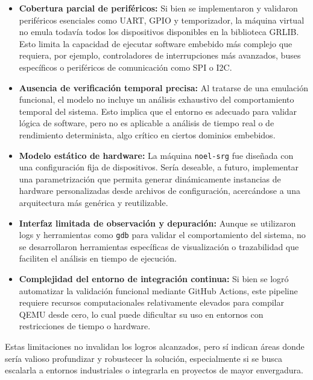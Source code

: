 \begin{itemize}
    \item \textbf{Cobertura parcial de periféricos:} Si bien se implementaron y validaron periféricos esenciales como UART, GPIO y temporizador, la máquina virtual no emula todavía todos los dispositivos disponibles en la biblioteca GRLIB. Esto limita la capacidad de ejecutar software embebido más complejo que requiera, por ejemplo, controladores de interrupciones más avanzados, buses específicos o periféricos de comunicación como SPI o I2C.

    \item \textbf{Ausencia de verificación temporal precisa:} Al tratarse de una emulación funcional, el modelo no incluye un análisis exhaustivo del comportamiento temporal del sistema. Esto implica que el entorno es adecuado para validar lógica de software, pero no es aplicable a análisis de tiempo real o de rendimiento determinista, algo crítico en ciertos dominios embebidos.

    \item \textbf{Modelo estático de hardware:} La máquina \texttt{noel-srg} fue diseñada con una configuración fija de dispositivos. Sería deseable, a futuro, implementar una parametrización que permita generar dinámicamente instancias de hardware personalizadas desde archivos de configuración, acercándose a una arquitectura más genérica y reutilizable.

    \item \textbf{Interfaz limitada de observación y depuración:} Aunque se utilizaron logs y herramientas como \texttt{gdb} para validar el comportamiento del sistema, no se desarrollaron herramientas específicas de visualización o trazabilidad que faciliten el análisis en tiempo de ejecución.

    \item \textbf{Complejidad del entorno de integración continua:} Si bien se logró automatizar la validación funcional mediante GitHub Actions, este pipeline requiere recursos computacionales relativamente elevados para compilar QEMU desde cero, lo cual puede dificultar su uso en entornos con restricciones de tiempo o hardware.
\end{itemize}

Estas limitaciones no invalidan los logros alcanzados, pero sí indican áreas donde sería valioso profundizar y robustecer la solución, especialmente si se busca escalarla a entornos industriales o integrarla en proyectos de mayor envergadura.

